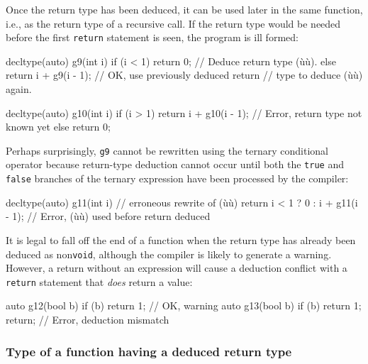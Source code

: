 \noindent Once the return type has been deduced, it can be used later in the same
function, i.e., as the return type of a recursive call. If the return
type would be needed before the first \lstinline!return! statement is seen,
the program is ill formed:

\begin{emcppslisting}[emcppsbatch=e2,emcppserrorlines={8,9,10,11,12}]
decltype(auto) g9(int i)
{
    if (i < 1) { return 0; }              // Deduce return type (ù{}ù).
    else       { return i + g9(i - 1); }  // OK, use previously deduced return
                                          // type to deduce (ù{}ù) again.
}

decltype(auto) g10(int i)
{
    if (i > 1) { return i + g10(i - 1); }  // Error, return type not known yet
    else       { return 0; }
}
\end{emcppslisting}
    

\noindent Perhaps surprisingly, \lstinline!g9! cannot be rewritten using the ternary
conditional operator because return-type deduction cannot occur until
both the \lstinline!true! and \lstinline!false! branches of the ternary
expression have been processed by the compiler:

\begin{emcppslisting}[emcppsbatch=e2]
decltype(auto) g11(int i)  // erroneous rewrite of (ù{}ù)
{
    return i < 1 ? 0 : i + g11(i - 1);
        // Error, (ù{}ù) used before return deduced
}
\end{emcppslisting}
    

\noindent It is legal to fall off the end of a function when the return type has
already been deduced as non\lstinline!void!, although the compiler is
likely to generate a warning. However, a return without an expression
will cause a deduction conflict with a \lstinline!return! statement that
\emph{does} return a value:

\begin{emcppslisting}[emcppsbatch=e2]
auto g12(bool b) { if (b) return 1;         }  // OK, warning
auto g13(bool b) { if (b) return 1; return; }  // Error, deduction mismatch
\end{emcppslisting}
    

\subsubsection[Type of a function having a deduced return type]{Type of a function having a deduced return type}\label{type-of-a-function-having-a-deduced-return-type}

